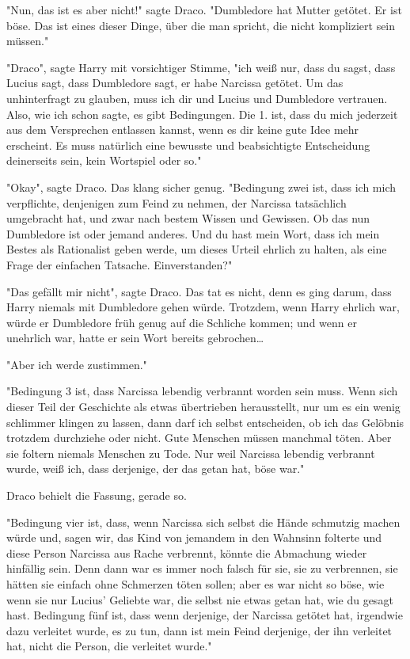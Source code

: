 {"Nun, das ist es aber nicht!" sagte Draco. "Dumbledore hat Mutter getötet. Er ist böse. Das ist eines dieser Dinge, über die man spricht, die nicht kompliziert sein müssen."

"Draco", sagte Harry mit vorsichtiger Stimme, "ich weiß nur, dass du sagst, dass Lucius sagt, dass Dumbledore sagt, er habe Narcissa getötet. Um das unhinterfragt zu glauben, muss ich dir und Lucius und Dumbledore vertrauen. Also, wie ich schon sagte, es gibt Bedingungen. Die 1. ist, dass du mich jederzeit aus dem Versprechen entlassen kannst, wenn es dir keine gute Idee mehr erscheint. Es muss natürlich eine bewusste und beabsichtigte Entscheidung deinerseits sein, kein Wortspiel oder so."

"Okay", sagte Draco. Das klang sicher genug. "Bedingung zwei ist, dass ich mich verpflichte, denjenigen zum Feind zu nehmen, der Narcissa tatsächlich umgebracht hat, und zwar nach bestem Wissen und Gewissen. Ob das nun Dumbledore ist oder jemand anderes. Und du hast mein Wort, dass ich mein Bestes als Rationalist geben werde, um dieses Urteil ehrlich zu halten, als eine Frage der einfachen Tatsache. Einverstanden?"

"Das gefällt mir nicht", sagte Draco. Das tat es nicht, denn es ging darum, dass Harry niemals mit Dumbledore gehen würde. Trotzdem, wenn Harry ehrlich war, würde er Dumbledore früh genug auf die Schliche kommen; und wenn er unehrlich war, hatte er sein Wort bereits gebrochen…

"Aber ich werde zustimmen."

"Bedingung 3 ist, dass Narcissa lebendig verbrannt worden sein muss. Wenn sich dieser Teil der Geschichte als etwas übertrieben herausstellt, nur um es ein wenig schlimmer klingen zu lassen, dann darf ich selbst entscheiden, ob ich das Gelöbnis trotzdem durchziehe oder nicht. Gute Menschen müssen manchmal töten. Aber sie foltern niemals Menschen zu Tode. Nur weil Narcissa lebendig verbrannt wurde, weiß ich, dass derjenige, der das getan hat, böse war."

Draco behielt die Fassung, gerade so.

"Bedingung vier ist, dass, wenn Narcissa sich selbst die Hände schmutzig machen würde und, sagen wir, das Kind von jemandem in den Wahnsinn folterte und diese Person Narcissa aus Rache verbrennt, könnte die Abmachung wieder hinfällig sein. Denn dann war es immer noch falsch für sie, sie zu verbrennen, sie hätten sie einfach ohne Schmerzen töten sollen; aber es war nicht so böse, wie wenn sie nur Lucius' Geliebte war, die selbst nie etwas getan hat, wie du gesagt hast. Bedingung fünf ist, dass wenn derjenige, der Narcissa getötet hat, irgendwie dazu verleitet wurde, es zu tun, dann ist mein Feind derjenige, der ihn verleitet hat, nicht die Person, die verleitet wurde."

}
